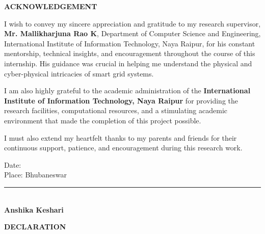 \documentclass[12pt,a4paper]{report}
\begin{document}
\thispagestyle{empty}
\vspace*{1.5cm}
\begin{center}
    {\Huge \textbf{ACKNOWLEDGEMENT}}
\end{center}
\vspace{1cm}

I wish to convey my sincere appreciation and gratitude to my research supervisor, \textbf{Mr. Mallikharjuna Rao K}, Department of Computer Science and Engineering, International Institute of Information Technology, Naya Raipur, for his constant mentorship, technical insights, and encouragement throughout the course of this internship. His guidance was crucial in helping me understand the physical and cyber-physical intricacies of smart grid systems.

\vspace{0.6cm}
I am also highly grateful to the academic administration of the \textbf{International Institute of Information Technology, Naya Raipur} for providing the research facilities, computational resources, and a stimulating academic environment that made the completion of this project possible.

\vspace{0.6cm}
I must also extend my heartfelt thanks to my parents and friends for their continuous support, patience, and encouragement during this research work.

\vspace{1.5cm}
\noindent
\begin{minipage}[t]{0.45\textwidth}
\raggedright
Date: \\[0.4cm]
Place: Bhubaneswar
\end{minipage}
\hfill
\begin{minipage}[t]{0.5\textwidth}
\centering
\rule{6cm}{0.4pt} \\[0.2cm]
\textbf{Anshika Keshari}
\end{minipage}

\newpage
\thispagestyle{empty}
\vspace*{1.5cm}
\begin{center}
    {\Huge\bfseries DECLARATION}
\end{center}
\vspace{1.5cm}
\end{document}
